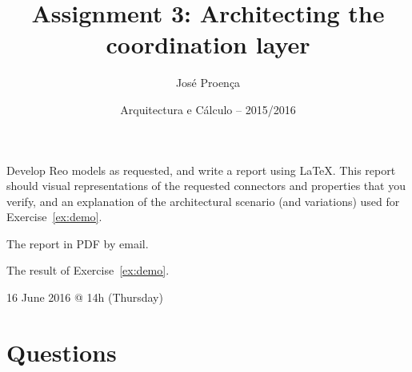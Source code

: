 \documentclass[11pt]{article}
\date{Arquitectura e C\'alculo -- 2015/2016}
\begin{document}
 
 
\title{Assignment 3: Architecting the coordination layer}
\author{Jos\'{e} Proen\c{c}a}
 
\maketitle

 Develop Reo models as requested, and write a report using LaTeX. This report should visual representations of the requested connectors and properties that you verify, and an explanation of the architectural scenario (and variations) used for Exercise~\ref{ex:demo}.

 The report in PDF by email.

 The result of Exercise~\ref{ex:demo}.

 16 June 2016 @ 14h (Thursday)
 
\section*{Questions}

%
%
%
%
%
\end{document}
